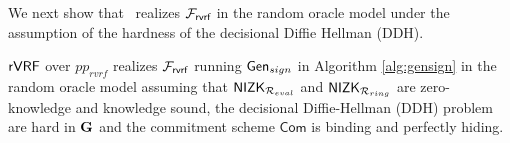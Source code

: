 We next show that \name \ realizes $ \mathcal{F}_{\textsf{rvrf}} $  in the random oracle model under the assumption of the hardness of the decisional Diffie Hellman (DDH).



\begin{theorem}
	$ {\mathsf{rVRF}} $  over  $ pp_{rvrf} $ realizes  $ \mathcal{F}_{\textsf{rvrf}} $ running $ \mathsf{Gen}_{sign} $ in Algorithm \ref{alg:gensign} \cite{canetti1,canetti2} in the random oracle model assuming that $ {\mathsf{NIZK}}_{\mathcal{R}_{eval}} $ and $ {\mathsf{NIZK}}_{\mathcal{R}_{ring}}$ are zero-knowledge and knowledge sound, the decisional Diffie-Hellman (DDH) problem are hard in $ {\mathbf{G}}  $  and the commitment scheme $ \mathsf{Com} $ is binding and perfectly hiding. 
\end{theorem}

